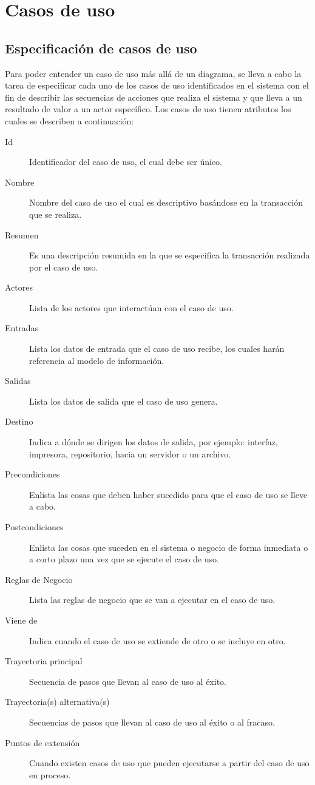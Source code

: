 \chapter{Casos de uso}


\section{Especificación de casos de uso}

Para poder entender un caso de uso más allá de un diagrama, se lleva a cabo la tarea de especificar cada uno de los casos de uso identificados en el sistema con el fin de describir las secuencias de acciones que realiza el sistema y que lleva a un resultado de valor a un actor específico. Los casos de uso tienen atributos los cuales se describen a continuación:

\begin{description}
	\item[Id] Identificador del caso de uso, el cual debe ser único.
	\item[Nombre] Nombre del caso de uso el cual es descriptivo basándose en la transacción que se realiza.
	\item[Resumen] Es una descripción resumida en la que se especifica la transacción realizada por el caso de uso.
	\item[Actores] Lista de los actores que interactúan con el caso de uso.
	\item[Entradas] Lista los datos de entrada que el caso de uso recibe, los cuales harán referencia al modelo de información.
	\item[Salidas] Lista los datos de salida que el caso de uso genera.
	\item[Destino] Indica a dónde se dirigen los datos de salida, por ejemplo: interfaz, impresora, repositorio, hacia un servidor o un archivo.
	\item[Precondiciones] Enlista las cosas que deben haber sucedido para que el caso  de uso se lleve a cabo.
	\item[Postcondiciones] Enlista las cosas que suceden en el sistema o negocio de forma inmediata o a corto plazo una vez que se ejecute el caso de uso.
	\item[Reglas de Negocio] Lista las reglas de negocio que se van a ejecutar en el caso de uso.
	\item[Viene de] Indica cuando el caso de uso se extiende de otro o se incluye en otro.
	\item[Trayectoria principal] Secuencia de pasos que llevan al caso de uso al éxito.
	\item[Trayectoria(s) alternativa(s)] Secuencias de pasos que llevan al caso de uso al éxito o al fracaso.
	\item[Puntos de extensión] Cuando existen casos de uso que pueden ejecutarse a partir del caso de uso en proceso.
\end{description}


